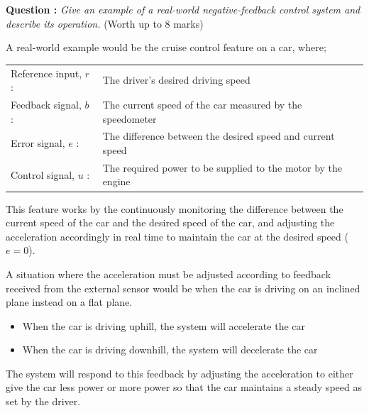 \documentclass[hidelinks,a4paper,11pt]{article}
\newcounter{question}
\newcommand\myq{\refstepcounter{question}\thequestion}
\begin{document}
{\bfseries Question \myq:}  \emph{Give an example of a real-world negative-feedback control system
and describe its operation.} (Worth up to 8 marks)\\
\begin{mdframed}
A real-world example would be the cruise control feature on a car, where;
\begin{center}
\begin{tabular}{p{3.3cm} p{8cm}}
Reference input, $r$ \hfill:& The driver's desired driving speed \\
Feedback signal, $b$ \hfill:& The current speed of the car measured by the speedometer  \\
Error signal, $e$    \hfill:& The difference between the desired speed and current speed  \\
Control signal, $u$  \hfill:& The required power to be supplied to the motor by the engine
\end{tabular}
\end{center}

This feature works by the continuously monitoring the difference between the current speed of the
car and the desired speed of the car, and adjusting the acceleration accordingly in real time to
maintain the car at the desired speed ($e=0$). \par A situation where the acceleration must be
adjusted according to feedback received from the external sensor would be when the car is driving on
an inclined plane instead on a flat plane.
\begin{itemize}
  \item When the car is driving uphill, the system will accelerate the car
  \item When the car is driving downhill, the system will decelerate the car
\end{itemize}
The system will respond to this feedback by adjusting the acceleration to either give the car less
power or more power so that the car maintains a steady speed as set by the driver.
\end{mdframed}
\vspace*{\baselineskip}
\end{document}
